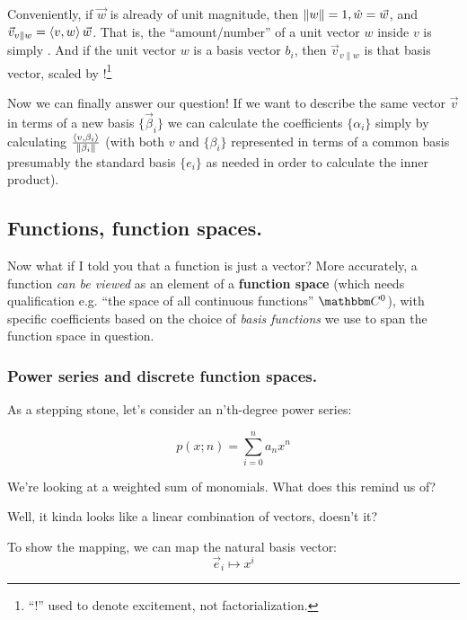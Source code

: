 \documentclass[letterpaper,12pt]{report}
\begin{document}
Conveniently, if \(\vec{w}\) is already of unit magnitude, 
then \(\norm[w] = 1, \hat{w} = \vec{w}\), and
\(\vec{v}_{v\parallel w} = \innerprod[v][w]\vec{w}\).
That is, the ``amount/number'' of a 
unit vector \(w\) inside \(v\) is simply \innerprod[u][v].
And if the unit vector \(w\) is a basis vector \(b_i\), then 
\(\vec{v}_{v\parallel w}\) is 
that basis vector, scaled by \innerprod[v][b_i]!\footnote{
  ``!'' used to denote excitement, not factorialization.
}
\par

Now we can finally answer our question! 
If we want to describe the same vector \(\vec{v}\)
in terms of a new basis \(\{\vec{\beta}_i\}\) 
we can calculate the coefficients \(\{\alpha_i\}\)
simply by calculating \(\frac{\innerprod[v][\beta_i]}{\norm[\beta_i]}\)
(with both \(v\) and \(\{\beta_i\}\) represented
in terms of a common basis
\textemdash{} presumably the standard basis \(\{e_i\}\) \textemdash{}
as needed in order to calculate the inner product).


\subsection{Functions, function spaces.}

Now what if I told you that a function is just a vector?
More accurately, a function \emph{can be viewed}
as an element of a \textbf{function space} (which needs qualification \textemdash{}
e.g. ``the space of all continuous functions'' \(\domain{C}^0\)), 
with specific coefficients
based on the choice of \emph{basis functions} we use to span the function space in question.

\subsubsection{Power series and discrete function spaces.}


As a stepping stone, let's consider an n'th-degree power series:

\[p(x;n) = \sum_{i=0}^{n}a_n x^n \]

We're looking at a weighted sum of monomials. 
What does this remind us of?\par

Well, it kinda looks like a linear combination of vectors, doesn't it?\par

To show the mapping, we can map the natural basis vector:
\[\vec{e}_i \mapsto x^i \]
\end{document}
